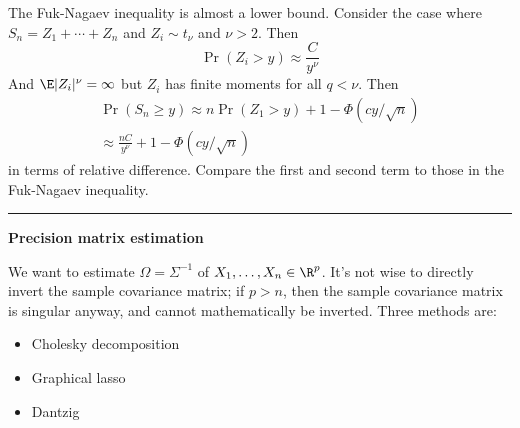 The Fuk-Nagaev inequality is almost a lower bound. Consider the case where \(S_n = Z_1 + \cdots + Z_n\) and \(Z_i \sim t_\nu\) and \(\nu > 2\). Then
\[\Pr(Z_i > y) \approx \frac{C}{y^\nu}\]
And \(\E |Z_i|^\nu = \infty\) but \(Z_i\) has finite moments for all \(q < \nu\). Then
\[\begin{gathered}\Pr(S_n \geq y) \approx  n \Pr(Z_1 > y) + 1 - \Phi(c y/\sqrt n) \\
\approx \frac{n C}{y^\nu} + 1 - \Phi(c y/\sqrt n)\end{gathered}\]
in terms of relative difference. Compare the first and second term to those in the Fuk-Nagaev inequality.

\begin{center}\rule{0.5\linewidth}{0.5pt}\end{center}

\textbf{Precision matrix estimation}

We want to estimate \(\Omega = \Sigma^{-1}\) of \(X_1, \dots, X_n \in \R^p\). It's not wise to directly invert the sample covariance matrix; if \(p > n\), then the sample covariance matrix is singular anyway, and cannot mathematically be inverted. Three methods are:

\begin{itemize}
\tightlist
\item
  Cholesky decomposition
\item
  Graphical lasso
\item
  Dantzig
\end{itemize}


